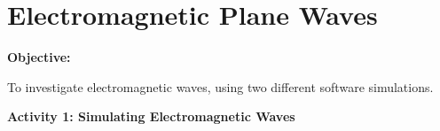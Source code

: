 \setcounter{equation}{0}
\setcounter{figure}{0}

\section{Electromagnetic Plane Waves}

\makelabheader %

\textbf{Objective:} 

To investigate electromagnetic waves, using two different software simulations.



\textbf{Activity 1: Simulating Electromagnetic Waves}

